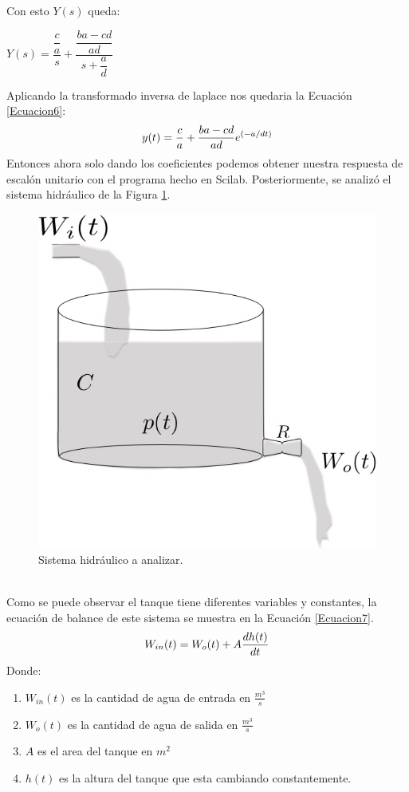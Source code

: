 \documentclass[12pt,a4paper]{article}
\begin{document}
Con esto $Y(s)$ queda:
\begin{center}
$Y(s) = \dfrac{\dfrac{c}{a}}{s} + \dfrac{\dfrac{ba - cd}{ad}}{s + \dfrac{a}{d}}$
\end{center}
Aplicando la transformado inversa de laplace nos quedaria la Ecuación \ref{Ecuacion6}:
\begin{equation}
\centering
y(t) = \frac{c}{a} + {\frac{ba-cd}{ad}}e^{(-a/dt)}
\label{Ecuacion6}
\end{equation}
Entonces ahora solo dando los coeficientes podemos obtener nuestra respuesta de escalón unitario con el programa hecho en Scilab. Posteriormente, se analizó el sistema hidráulico de la Figura \ref{Figura1}.\\
\begin{figure}[h!]
\centering
\includegraphics[scale=0.5]{Tank.jpg}
\caption{Sistema hidráulico a analizar.}
\label{Figura1}
\end{figure}\\
Como se puede observar el tanque tiene diferentes variables y constantes, la ecuación de balance de este sistema se muestra en la Ecuación \ref{Ecuacion7}.
\begin{equation}
\centering
W_{in}(t) = W_{o}(t) + A\dfrac{dh(t)}{dt}
\label{Ecuacion7}
\end{equation} 
Donde:
\begin{enumerate}[$\cdot$]
\item $W_{in}(t)$ es la cantidad de agua de entrada en $\frac{m^{3}}{s}$
\item $W_{o}(t)$ es la cantidad de agua de salida en $\frac{m^{3}}{s}$
\item $A$ es el area del tanque en $m^2$
\item $h(t)$ es la altura del tanque que esta cambiando constantemente.
\end{enumerate}
\end{document}
